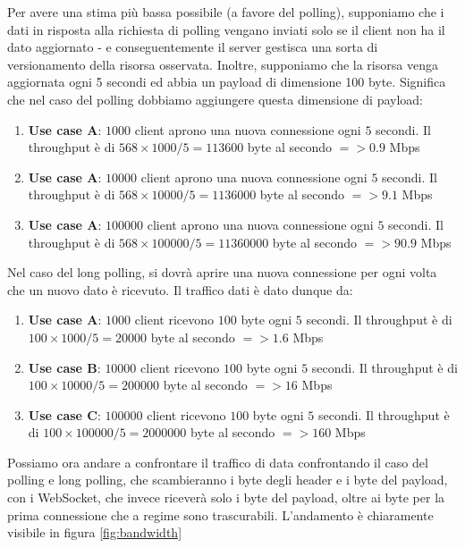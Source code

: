 \documentclass[12pt,a4paper,openright,twoside]{report}
\begin{document}
Per avere una stima più bassa possibile (a favore del polling), supponiamo che i dati in risposta alla richiesta di polling vengano inviati solo se il client non ha il dato aggiornato - e conseguentemente il server gestisca una sorta di versionamento della risorsa osservata. Inoltre, supponiamo che la risorsa venga aggiornata ogni 5 secondi ed abbia un payload di dimensione 100 byte. Significa che nel caso del polling dobbiamo aggiungere questa dimensione di payload:
\begin{enumerate}
\item \textbf{Use case A}: $1000$ client aprono una nuova connessione ogni $5$ secondi. Il throughput è di $568 \times 1000 / 5 = 113600$ byte al secondo $=> 0.9$ Mbps
\item \textbf{Use case A}: $10000$ client aprono una nuova connessione ogni $5$ secondi. Il throughput è di $568 \times 10000 / 5 = 1136000$ byte al secondo $=> 9.1$ Mbps
\item \textbf{Use case A}: $100000$ client aprono una nuova connessione ogni $5$ secondi. Il throughput è di $568 \times 100000 / 5 = 11360000$ byte al secondo $=> 90.9$ Mbps
\end{enumerate}

Nel caso del long polling, si dovrà aprire una nuova connessione per ogni volta che un nuovo dato è ricevuto. Il traffico dati è dato dunque da:
\begin{enumerate}
\item \textbf{Use case A}: $1000$ client ricevono $100$ byte ogni $5$ secondi. Il throughput è di $100 \times 1000 / 5 = 20000$ byte al secondo $=> 1.6$ Mbps
\item \textbf{Use case B}: $10000$ client ricevono $100$ byte ogni $5$ secondi. Il throughput è di $100 \times 10000 / 5 = 200000$ byte al secondo $=> 16$ Mbps
\item \textbf{Use case C}: $100000$ client ricevono $100$ byte ogni $5$ secondi. Il throughput è di $100 \times 100000 / 5 = 2000000$ byte al secondo $=> 160$ Mbps
\end{enumerate}

Possiamo ora andare a confrontare il traffico di data confrontando il caso del polling e long polling, che scambieranno i byte degli header e i byte del payload, con i WebSocket, che invece riceverà solo i byte del payload, oltre ai byte per la prima connessione che a regime sono trascurabili\cite{websocket_performance}. L'andamento è chiaramente visibile in figura \ref{fig:bandwidth}
\end{document}
